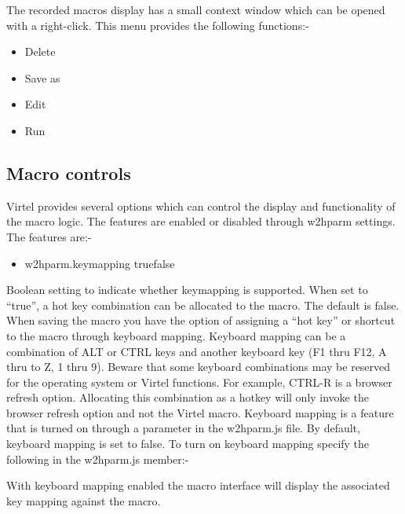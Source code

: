 \documentclass[letterpaper,10pt,english]{sphinxmanual}
\begin{document}
The recorded macros display has a small context window which can be opened with a right-click. This menu provides the following functions:-
\begin{itemize}
\item {} 
Delete

\item {} 
Save as

\item {} 
Edit

\item {} 
Run

\end{itemize}


\subsection{Macro controls}
\label{\detokenize{User_Guide:macro-controls}}
Virtel provides several options which can control the display and functionality of the macro logic. The features are enabled or disabled through w2hparm settings. The features are:-
\begin{itemize}
\item {} 
w2hparm.keymapping true\textbar{}false

\end{itemize}

Boolean setting to indicate whether keymapping is supported. When set to “true”, a hot key combination can be allocated to the macro. The default is false. When saving the macro you have the option of assigning a “hot key” or shortcut to the macro through keyboard mapping. Keyboard mapping can be a combination of ALT or CTRL keys and another keyboard key (F1 thru F12, A thru to Z, 1 thru 9). Beware that some keyboard combinations may be reserved for the operating system or Virtel functions. For example, CTRL-R is a browser refresh option. Allocating this combination as a hotkey will only invoke the browser refresh option and not the Virtel macro. Keyboard mapping is a feature that is turned on through a parameter in the w2hparm.js file. By default, keyboard mapping is set to false. To turn on keyboard mapping specify the following in the w2hparm.js member:-

\begin{sphinxVerbatim}[commandchars=\\\{\}]
\end{sphinxVerbatim}

With keyboard mapping enabled the macro interface will display the associated key mapping against the macro.
\end{document}
